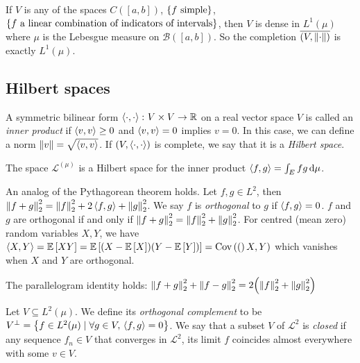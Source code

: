 \begin{remark}
	If \( V \) is any of the spaces \( C([a,b]) \), \( \qty{f \text{ simple}} \), \( \qty{f \text{ a linear combination of indicators of intervals}} \), then \( V \) is dense in \( L^1(\mu) \) where \( \mu \) is the Lebesgue measure on \( \mathcal B([a,b]) \).
	So the completion \( \overline{(V,\norm{\cdot})} \) is exactly \( L^1(\mu) \).
\end{remark}

\subsection{Hilbert spaces}
\begin{definition}
	A symmetric bilinear form \( \left\langle{\cdot, \cdot}\right\rangle \colon V \times V \to \mathbb R \) on a real vector space \( V \) is called an \emph{inner product} if \( \left\langle{v,v}\right\rangle \geq 0 \) and \( \left\langle{v,v}\right\rangle = 0 \) implies \( v = 0 \).
	In this case, we can define a norm \( \norm{v} = \sqrt{\left\langle{v,v}\right\rangle} \).
	If \( (V,\left\langle{\cdot,\cdot}\right\rangle) \) is complete, we say that it is a \emph{Hilbert space}.
\end{definition}
\begin{corollary}
	The space \( \mathcal L^(\mu) \) is a Hilbert space for the inner product \( \left\langle{f,g}\right\rangle = \int_E fg \dd{\mu} \).
\end{corollary}
\begin{example}
	An analog of the Pythagorean theorem holds.
	Let \( f, g \in L^2 \), then \( \norm{f + g}_2^2 = \norm{f}_2^2 + 2\left\langle{f,g}\right\rangle + \norm{g}_2^2 \).
	We say \( f \) is \emph{orthogonal} to \( g \) if \( \left\langle{f,g}\right\rangle = 0 \).
	\( f \) and \( g \) are orthogonal if and only if \( \norm{f + g}_2^2 = \norm{f}_2^2 + \norm{g}_2^2 \).
	For centred (mean zero) random variables \( X, Y \), we have \( \left\langle{X,Y}\right\rangle = \mathbb{E}\left[{XY}\right] = \mathbb{E}\left[{(X - \mathbb{E}\left[{X}\right])(Y - \mathbb{E}\left[{Y}\right])}\right] = \operatorname{Cov}\left({(}\right)X,Y) \) which vanishes when \( X \) and \( Y \) are orthogonal.
\end{example}
\begin{example}
	The parallelogram identity holds: \( \norm{f+g}_2^2 + \norm{f-g}_2^2 = 2 \qty(\norm{f}_2^2 + \norm{g}_2^2) \)
\end{example}
\begin{definition}
	Let \( V \subseteq L^2(\mu) \).
	We define its \emph{orthogonal complement} to be \( V^\perp = \qty{f \in L^2(\mu) \mid \forall g \in V,\, \left\langle{f,g}\right\rangle = 0} \).
	We say that a subset \( V \) of \( \mathcal L^2 \) is \emph{closed} if any sequence \( f_n \in V \) that converges in \( \mathcal L^2 \), its limit \( f \) coincides almost everywhere with some \( v \in V \).
\end{definition}
